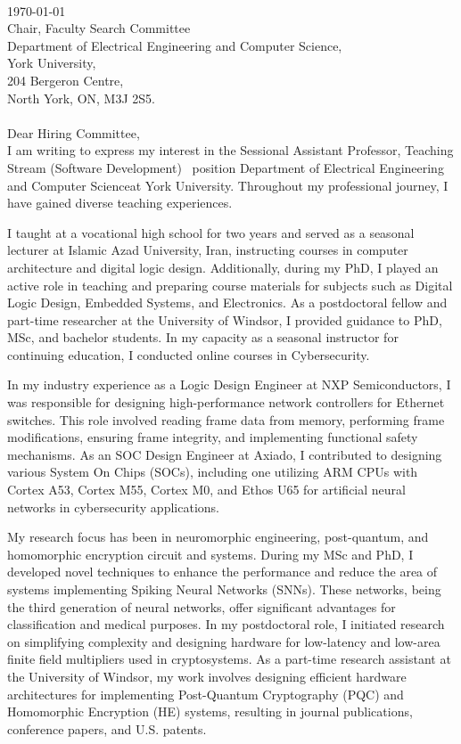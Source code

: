\documentclass[12pt,oneside]{book}
\newcommand{\position}{Sessional Assistant Professor, Teaching Stream (Software Development) }
\newcommand{\department}{Department of Electrical Engineering and Computer Science}
\newcommand{\university}{York University}
\begin{document}
\thispagestyle{empty}
\vspace*{-5em} \phantom \quad \\
\today\\
Chair, Faculty Search Committee\\
\department ,\\
\university ,\\
204 Bergeron Centre, \\
North York, ON, M3J 2S5.\\
\phantom \quad \\
Dear Hiring Committee,\\

I am writing to express my interest in the \position ~position   \department at \university. Throughout my professional journey, I have gained diverse teaching experiences. 

I taught at a vocational high school for two years and served as a seasonal lecturer at Islamic Azad University, Iran, instructing courses in computer architecture and digital logic design. Additionally, during my PhD, I played an active role in teaching and preparing course materials for subjects such as Digital Logic Design, Embedded Systems, and Electronics. As a postdoctoral fellow and part-time researcher at the University of Windsor, I provided guidance to PhD, MSc, and bachelor students. In my capacity as a seasonal instructor for continuing education, I conducted online courses in Cybersecurity.

In my industry experience as a Logic Design Engineer at NXP Semiconductors, I was responsible for designing high-performance network controllers for Ethernet switches. This role involved reading frame data from memory, performing frame modifications, ensuring frame integrity, and implementing functional safety mechanisms. As an SOC Design Engineer at Axiado, I contributed to designing various System On Chips (SOCs), including one utilizing ARM CPUs with Cortex A53, Cortex M55, Cortex M0, and Ethos U65 for artificial neural networks in cybersecurity applications.

My research focus has been in neuromorphic engineering, post-quantum, and homomorphic encryption circuit and systems. During my MSc and PhD, I developed novel techniques to enhance the performance and reduce the area of systems implementing Spiking Neural Networks (SNNs). These networks, being the third generation of neural networks, offer significant advantages for classification and medical purposes. In my postdoctoral role, I initiated research on simplifying complexity and designing hardware for low-latency and low-area finite field multipliers used in cryptosystems. As a part-time research assistant at the University of Windsor, my work involves designing efficient hardware architectures for implementing Post-Quantum Cryptography (PQC) and Homomorphic Encryption (HE) systems, resulting in  journal publications,  conference papers, and  U.S. patents.
\end{document}
